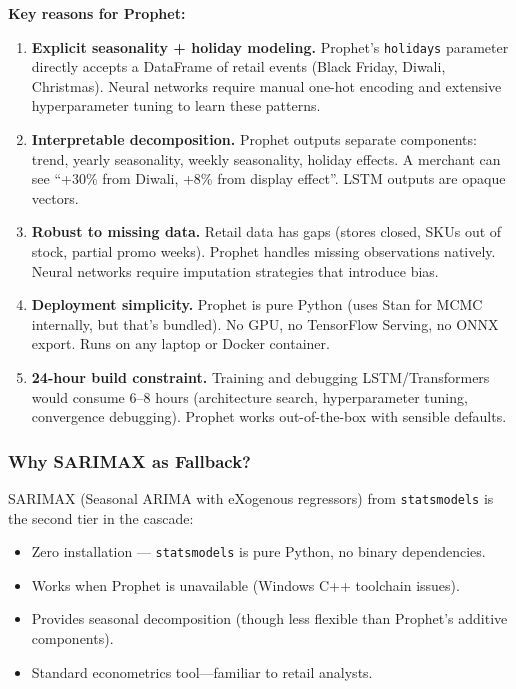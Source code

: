 \documentclass[11pt, a4paper]{article}
\begin{document}
\textbf{Key reasons for Prophet:}
\begin{enumerate}[leftmargin=1.5em]
    \item \textbf{Explicit seasonality + holiday modeling.} Prophet's \texttt{holidays} parameter directly accepts a DataFrame of retail events (Black Friday, Diwali, Christmas). Neural networks require manual one-hot encoding and extensive hyperparameter tuning to learn these patterns.
    
    \item \textbf{Interpretable decomposition.} Prophet outputs separate components: trend, yearly seasonality, weekly seasonality, holiday effects. A merchant can see ``+30\% from Diwali, +8\% from display effect''. LSTM outputs are opaque vectors.
    
    \item \textbf{Robust to missing data.} Retail data has gaps (stores closed, SKUs out of stock, partial promo weeks). Prophet handles missing observations natively. Neural networks require imputation strategies that introduce bias.
    
    \item \textbf{Deployment simplicity.} Prophet is pure Python (uses Stan for MCMC internally, but that's bundled). No GPU, no TensorFlow Serving, no ONNX export. Runs on any laptop or Docker container.
    
    \item \textbf{24-hour build constraint.} Training and debugging LSTM/Transformers would consume 6--8 hours (architecture search, hyperparameter tuning, convergence debugging). Prophet works out-of-the-box with sensible defaults.
\end{enumerate}

\subsubsection{Why SARIMAX as Fallback?}

SARIMAX (Seasonal ARIMA with eXogenous regressors) from \texttt{statsmodels} is the second tier in the cascade:
\begin{itemize}[leftmargin=1.5em]
    \item Zero installation --- \texttt{statsmodels} is pure Python, no binary dependencies.
    \item Works when Prophet is unavailable (Windows C++ toolchain issues).
    \item Provides seasonal decomposition (though less flexible than Prophet's additive components).
    \item Standard econometrics tool---familiar to retail analysts.
\end{itemize}
\end{document}
